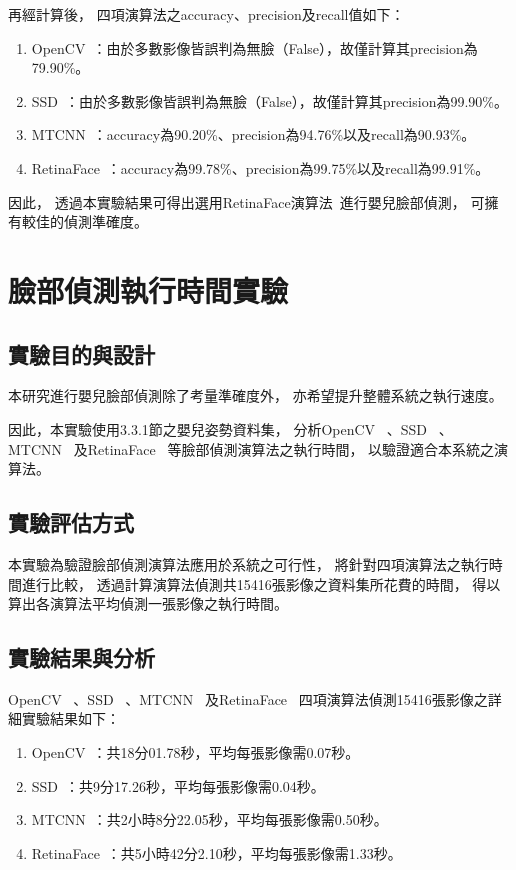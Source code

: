 \documentclass[class=NCU_thesis, crop=false]{standalone}
\begin{document}
再經計算後，
四項演算法之accuracy、precision及recall值如下：
\begin{enumerate}
    \item OpenCV~\cite{goyal_face_2017}：由於多數影像皆誤判為無臉（False），故僅計算其precision為79.90\%。
    \item SSD~\cite{ye_face_2021}：由於多數影像皆誤判為無臉（False），故僅計算其precision為99.90\%。
    \item MTCNN~\cite{zhang_joint_2016}：accuracy為90.20\%、precision為94.76\%以及recall為90.93\%。
    \item RetinaFace~\cite{deng_retinaface_2020}：accuracy為99.78\%、precision為99.75\%以及recall為99.91\%。
\end{enumerate}

因此，
透過本實驗結果可得出選用RetinaFace演算法~\cite{deng_retinaface_2020}進行嬰兒臉部偵測，
可擁有較佳的偵測準確度。

\section{臉部偵測執行時間實驗}
\subsection{實驗目的與設計}
本研究進行嬰兒臉部偵測除了考量準確度外，
亦希望提升整體系統之執行速度。

因此，本實驗使用3.3.1節之嬰兒姿勢資料集，
分析OpenCV~\cite{goyal_face_2017}
、SSD~\cite{ye_face_2021}
、MTCNN~\cite{zhang_joint_2016}
及RetinaFace~\cite{deng_retinaface_2020}
等臉部偵測演算法之執行時間，
以驗證適合本系統之演算法。

\subsection{實驗評估方式}
本實驗為驗證臉部偵測演算法應用於系統之可行性，
將針對四項演算法之執行時間進行比較，
透過計算演算法偵測共15416張影像之資料集所花費的時間，
得以算出各演算法平均偵測一張影像之執行時間。

\subsection{實驗結果與分析}
OpenCV~\cite{goyal_face_2017}
、SSD~\cite{ye_face_2021}
、MTCNN~\cite{zhang_joint_2016}
及RetinaFace~\cite{deng_retinaface_2020}
四項演算法偵測15416張影像之詳細實驗結果如下：
\begin{enumerate}
    \item OpenCV~\cite{goyal_face_2017}：共18分01.78秒，平均每張影像需0.07秒。
    \item SSD~\cite{ye_face_2021}：共9分17.26秒，平均每張影像需0.04秒。
    \item MTCNN~\cite{zhang_joint_2016}：共2小時8分22.05秒，平均每張影像需0.50秒。
    \item RetinaFace~\cite{deng_retinaface_2020}：共5小時42分2.10秒，平均每張影像需1.33秒。
\end{enumerate}
\end{document}
